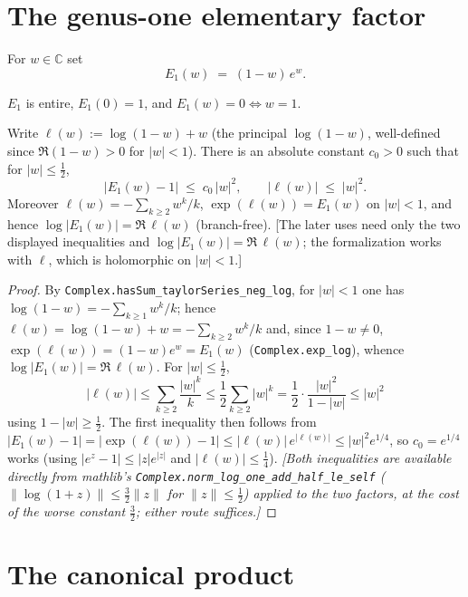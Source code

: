 \section{The genus-one elementary factor}
\label{sec:hf_elem}

\begin{definition}
\label{def:hf_elem}
\leanok
For $w\in\mathbb C$ set
\[
  E_1(w)\;=\;(1-w)\,e^{w}.
\]
\end{definition}

$E_1$ is entire, $E_1(0)=1$, and $E_1(w)=0\iff w=1$.

\begin{lemma}
\label{lem:hf_elem_bound}
\leanok
{}
Write $\ell(w):=\log(1-w)+w$ (the principal $\log(1-w)$, well-defined since
$\Re(1-w)>0$ for $|w|<1$). There is an absolute constant $c_0>0$ such that for
$|w|\le\tfrac12$,
\[
  \bigl|E_1(w)-1\bigr|\;\le\;c_0\,|w|^{2},
  \qquad
  \bigl|\ell(w)\bigr|\;\le\;|w|^{2}.
\]
Moreover $\ell(w)=-\sum_{k\ge2}w^{k}/k$, $\exp(\ell(w))=E_1(w)$ on $|w|<1$, and
hence $\log|E_1(w)|=\Re\,\ell(w)$ (branch-free). [The later uses need only the
two displayed inequalities and $\log|E_1(w)|=\Re\,\ell(w)$; the formalization works
with $\ell$, which is holomorphic on $|w|<1$.]
\end{lemma}

\begin{proof}
\leanok
{}
By \texttt{Complex.hasSum\_taylorSeries\_neg\_log}, for $|w|<1$ one has
$\log(1-w)=-\sum_{k\ge1}w^{k}/k$; hence
$\ell(w)=\log(1-w)+w=-\sum_{k\ge2}w^{k}/k$ and, since $1-w\neq0$,
$\exp(\ell(w))=(1-w)e^{w}=E_1(w)$ (\texttt{Complex.exp\_log}), whence
$\log|E_1(w)|=\Re\,\ell(w)$. For $|w|\le\tfrac12$,
\[
  |\ell(w)|\le\sum_{k\ge2}\frac{|w|^{k}}{k}\le\frac12\sum_{k\ge2}|w|^{k}
   =\frac12\cdot\frac{|w|^{2}}{1-|w|}\le|w|^{2}
\]
using $1-|w|\ge\tfrac12$. The first inequality then follows from
$|E_1(w)-1|=|\exp(\ell(w))-1|\le|\ell(w)|\,e^{|\ell(w)|}\le
|w|^{2}e^{1/4}$, so $c_0=e^{1/4}$ works (using $|e^{z}-1|\le|z|e^{|z|}$ and
$|\ell(w)|\le\tfrac14$). \emph{[Both inequalities are available directly from
mathlib's \texttt{Complex.norm\_log\_one\_add\_half\_le\_self}
($\|\log(1+z)\|\le\tfrac32\|z\|$ for $\|z\|\le\tfrac12$) applied to the two factors,
at the cost of the worse constant $\tfrac32$; either route suffices.]}
\end{proof}

\section{The canonical product}
\label{sec:hf_prod}

